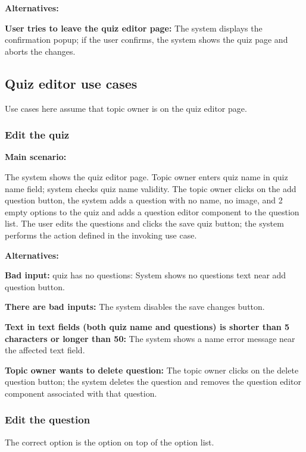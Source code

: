 \documentclass[
    english, %
]{VUMIFPSkursinis}
\begin{document}
\noindent\textbf{\fontsize{13}{15}\selectfont Alternatives:}

\textbf{User tries to leave the quiz editor page:} The system displays the confirmation popup; if the user confirms, the system shows the quiz page and aborts the changes.

\subsection{Quiz editor use cases}

Use cases here assume that topic owner is on the quiz editor page.

\subsubsection{Edit the quiz}

\noindent\textbf{\fontsize{13}{15}\selectfont Main scenario:}

The system shows the quiz editor page. Topic owner enters quiz name in quiz name field; system checks quiz name validity. The topic owner clicks on the add question button, the system adds a question with no name, no image, and 2 empty options to the quiz and adds a question editor component to the question list. The user edits the questions and clicks the save quiz button; the system performs the action defined in the invoking use case.

\noindent\textbf{\fontsize{13}{15}\selectfont Alternatives:}

\textbf{Bad input:} quiz has no questions: System shows no questions text near add question button.

\textbf{There are bad inputs:} The system disables the save changes button.

\textbf{Text in text fields (both quiz name and questions) is shorter than 5 characters or longer than 50:} The system shows a name error message near the affected text field.

\textbf{Topic owner wants to delete question:} The topic owner clicks on the delete question button; the system deletes the question and removes the question editor component associated with that question.

\subsubsection{Edit the question}

The correct option is the option on top of the option list.
\end{document}

